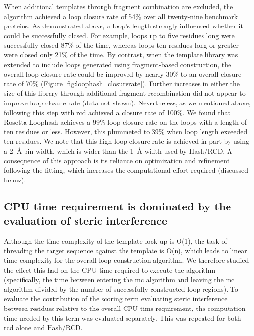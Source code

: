 When additional templates through fragment combination are excluded, the algorithm achieved a loop closure rate of 54\% over all twenty-nine benchmark proteins. As demonstrated above, a loop's length strongly influenced whether it could be successfully closed. For example, loops up to five residues long were successfully closed 87\% of the time, whereas loops ten residues long or greater were closed only 21\% of the time. By contrast, when the template library was extended to include loops generated using fragment-based construction, the overall loop closure rate could be improved by nearly 30\% to an overall closure rate of 70\% (Figure \ref{fig:loophash_closurerate}). Further increases in either the size of this library through additional fragment recombination did not appear to improve loop closure rate (data not shown). Nevertheless, as we mentioned above, following this step with \gls{rcd} achieved a closure rate of 100\%.
We found that Rosetta Loophash achieves a 99\% loop closure rate on the loops with a length of ten residues or less. However, this plummeted to 39\% when loop length exceeded ten residues. We note that this high loop closure rate is achieved in part by using a \SI{2}{\angstrom} bin width, which is wider than the \SI{1}{\angstrom} width used by Hash/RCD. A consequence of this approach is its reliance on optimization and refinement following the fitting, which increases the computational effort required (discussed below).

\subsection{CPU time requirement is dominated by the evaluation of steric interference}

Although the time complexity of the template look-up is O(1), the task of threading the target sequence against the template is O(n), which leads to linear time complexity for the overall loop construction algorithm. We therefore studied the effect this had on the CPU time required to execute the algorithm (specifically, the time between entering the \gls{mc} algorithm and leaving the \gls{mc} algorithm divided by the number of successfully constructed loop regions). To evaluate the contribution of the scoring term evaluating steric interference between residues relative to the overall CPU time requirement, the computation time needed by this term was evaluated separately. This was repeated for both \gls{rcd} alone and Hash/RCD.

